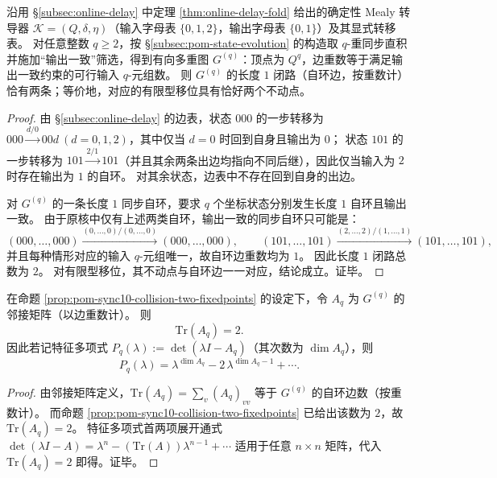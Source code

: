 \begin{proposition}[10 状态同步核的两固定点刚性]\label{prop:pom-sync10-collision-two-fixedpoints}
沿用 \S\ref{subsec:online-delay} 中定理 \ref{thm:online-delay-fold} 给出的确定性 Mealy 转导器 \(\mathcal K=(Q,\delta,\eta)\)（输入字母表 \(\{0,1,2\}\)，输出字母表 \(\{0,1\}\)）及其显式转移表。
对任意整数 \(q\ge 2\)，按 \S\ref{subsec:pom-state-evolution} 的构造取 \(q\)-重同步直积并施加“输出一致”筛选，得到有向多重图 \(G^{(q)}\)：顶点为 \(Q^q\)，边重数等于满足输出一致约束的可行输入 \(q\)-元组数。
则 \(G^{(q)}\) 的长度 \(1\) 闭路（自环边，按重数计）恰有两条；等价地，对应的有限型移位具有恰好两个不动点。
\end{proposition}
\begin{proof}
由 \S\ref{subsec:online-delay} 的边表，状态 \(000\) 的一步转移为 \(000\xrightarrow{d/0}00d\ (d=0,1,2)\)，其中仅当 \(d=0\) 时回到自身且输出为 \(0\)；
状态 \(101\) 的一步转移为 \(101\xrightarrow{2/1}101\)（并且其余两条出边均指向不同后继），因此仅当输入为 \(2\) 时存在输出为 \(1\) 的自环。
对其余状态，边表中不存在回到自身的出边。
\par
对 \(G^{(q)}\) 的一条长度 \(1\) 同步自环，要求 \(q\) 个坐标状态分别发生长度 \(1\) 自环且输出一致。
由于原核中仅有上述两类自环，输出一致的同步自环只可能是：
\[
(000,\dots,000)\xrightarrow{(0,\dots,0)/(0,\dots,0)}(000,\dots,000),
\qquad
(101,\dots,101)\xrightarrow{(2,\dots,2)/(1,\dots,1)}(101,\dots,101),
\]
并且每种情形对应的输入 \(q\)-元组唯一，故自环边重数均为 \(1\)。
因此长度 \(1\) 闭路总数为 \(2\)。
对有限型移位，其不动点与自环边一一对应，结论成立。证毕。
\end{proof}

\begin{corollary}[同步碰撞核的迹恒等式与首系数刚性]\label{cor:pom-sync10-collision-trace-two}
在命题 \ref{prop:pom-sync10-collision-two-fixedpoints} 的设定下，令 \(A_q\) 为 \(G^{(q)}\) 的邻接矩阵（以边重数计）。
则
\[
\mathrm{Tr}(A_q)=2.
\]
因此若记特征多项式 \(P_q(\lambda):=\det(\lambda I-A_q)\)（其次数为 \(\dim A_q\)），则
\[
P_q(\lambda)=\lambda^{\dim A_q}-2\,\lambda^{\dim A_q-1}+\cdots.
\]
\end{corollary}
\begin{proof}
由邻接矩阵定义，\(\mathrm{Tr}(A_q)=\sum_v (A_q)_{vv}\) 等于 \(G^{(q)}\) 的自环边数（按重数计）。
而命题 \ref{prop:pom-sync10-collision-two-fixedpoints} 已给出该数为 \(2\)，故 \(\mathrm{Tr}(A_q)=2\)。
特征多项式首两项展开通式 \( \det(\lambda I-A)=\lambda^{n}-(\mathrm{Tr}(A))\lambda^{n-1}+\cdots \) 适用于任意 \(n\times n\) 矩阵，代入 \(\mathrm{Tr}(A_q)=2\) 即得。证毕。
\end{proof}

\endinput
